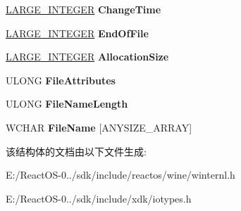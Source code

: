 \begin{DoxyCompactItemize}
\item 
\mbox{\label{struct___f_i_l_e___d_i_r_e_c_t_o_r_y___i_n_f_o_r_m_a_t_i_o_n_a17d601bcb5e8ba79c175bec66d2d7ad2}} 
\hyperlink{union___l_a_r_g_e___i_n_t_e_g_e_r}{L\+A\+R\+G\+E\+\_\+\+I\+N\+T\+E\+G\+ER} {\bfseries Change\+Time}
\item 
\mbox{\label{struct___f_i_l_e___d_i_r_e_c_t_o_r_y___i_n_f_o_r_m_a_t_i_o_n_a2ecd4ddca31a57275dd1f46efb87931c}} 
\hyperlink{union___l_a_r_g_e___i_n_t_e_g_e_r}{L\+A\+R\+G\+E\+\_\+\+I\+N\+T\+E\+G\+ER} {\bfseries End\+Of\+File}
\item 
\mbox{\label{struct___f_i_l_e___d_i_r_e_c_t_o_r_y___i_n_f_o_r_m_a_t_i_o_n_afc91bd7358e56ee76e335e94ee3e222c}} 
\hyperlink{union___l_a_r_g_e___i_n_t_e_g_e_r}{L\+A\+R\+G\+E\+\_\+\+I\+N\+T\+E\+G\+ER} {\bfseries Allocation\+Size}
\item 
\mbox{\label{struct___f_i_l_e___d_i_r_e_c_t_o_r_y___i_n_f_o_r_m_a_t_i_o_n_a347199ccec0d313cbd476d776cf98e97}} 
U\+L\+O\+NG {\bfseries File\+Attributes}
\item 
\mbox{\label{struct___f_i_l_e___d_i_r_e_c_t_o_r_y___i_n_f_o_r_m_a_t_i_o_n_a74bf89906352a75d1de85de1377e9cda}} 
U\+L\+O\+NG {\bfseries File\+Name\+Length}
\item 
\mbox{\label{struct___f_i_l_e___d_i_r_e_c_t_o_r_y___i_n_f_o_r_m_a_t_i_o_n_a098530d4ad5fb6075d5b10bba98f4905}} 
W\+C\+H\+AR {\bfseries File\+Name} \mbox{[}A\+N\+Y\+S\+I\+Z\+E\+\_\+\+A\+R\+R\+AY\mbox{]}
\end{DoxyCompactItemize}


该结构体的文档由以下文件生成\+:\begin{DoxyCompactItemize}
\item 
E\+:/\+React\+O\+S-\/0../sdk/include/reactos/wine/winternl.\+h\item 
E\+:/\+React\+O\+S-\/0../sdk/include/xdk/iotypes.\+h\end{DoxyCompactItemize}
